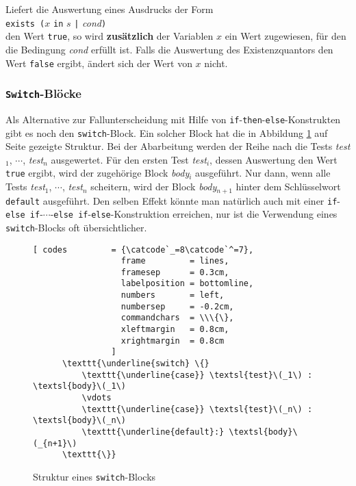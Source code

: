 \remark
Liefert die Auswertung eines Ausdrucks der Form
\\[0.2cm]
\hspace*{1.3cm}
\texttt{exists (}$x$ \texttt{in} $s$ \texttt{|} \textsl{cond}\texttt{)}
\\[0.2cm]
den Wert \texttt{true}, so wird 
\textbf{zus\"{a}tzlich} der Variablen $x$ ein Wert zugewiesen, f\"{u}r den die Bedingung \textsl{cond}
erf\"{u}llt ist.   Falls die Auswertung des Existenzquantors den Wert \texttt{false} ergibt,
\"{a}ndert sich der Wert von  $x$ nicht.


\subsubsection{\texttt{Switch}-Bl\"{o}cke}
Als Alternative zur Fallunterscheidung mit Hilfe von \texttt{if}-\texttt{then}-\texttt{else}-Konstrukten
gibt es noch den \texttt{switch}-Block.  Ein solcher Block hat die  in Abbildung \ref{fig:case} auf Seite
\pageref{fig:case} gezeigte Struktur.  Bei der Abarbeitung werden der Reihe nach
die Tests \textsl{test}$_1$, $\cdots$, \textsl{test}$_n$
ausgewertet. F\"{u}r den ersten Test \textsl{test}$_i$, dessen
Auswertung den Wert \texttt{true} ergibt, wird der zugeh\"{o}rige Block
\textsl{body}$_i$ ausgef\"{u}hrt.  Nur dann, wenn alle Tests 
\textsl{test}$_1$, $\cdots$, \textsl{test}$_n$
scheitern, wird der Block \textsl{body}$_{n+1}$ hinter dem Schl\"{u}sselwort
\texttt{default} ausgef\"{u}hrt.  Den selben Effekt k\"{o}nnte man nat\"{u}rlich auch mit
einer \texttt{if}-\texttt{else if}-$\cdots$-\texttt{else if}-\texttt{else}-Konstruktion erreichen,
nur ist die Verwendung eines \texttt{switch}-Blocks oft 
\"{u}bersichtlicher.

\begin{figure}[!ht]
  \centering
\begin{Verbatim}[ codes         = {\catcode`_=8\catcode`^=7},
                  frame         = lines, 
                  framesep      = 0.3cm, 
                  labelposition = bottomline,
                  numbers       = left,
                  numbersep     = -0.2cm,
                  commandchars  = \\\{\},
                  xleftmargin   = 0.8cm,
                  xrightmargin  = 0.8cm
                ]
      \texttt{\underline{switch} \{}
          \texttt{\underline{case}} \textsl{test}\(_1\) : \textsl{body}\(_1\) 
          \vdots
          \texttt{\underline{case}} \textsl{test}\(_n\) : \textsl{body}\(_n\)
          \texttt{\underline{default}:} \textsl{body}\(_{n+1}\)
      \texttt{\}}
\end{Verbatim}
\vspace*{-0.3cm}
\caption{Struktur eines \texttt{switch}-Blocks}  \label{fig:case}
\end{figure} 

